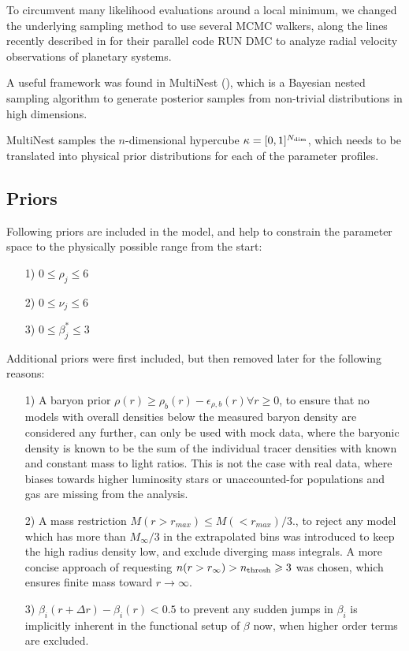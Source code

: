 To circumvent many likelihood evaluations around a local minimum, we
changed the underlying sampling method to use several MCMC walkers,
along the lines recently described in \citep{Nelson+2013} for their
parallel code RUN DMC to analyze radial velocity observations of
planetary systems.

A useful framework was found in MultiNest (\cite{Feroz+2009}), which
is a Bayesian nested sampling algorithm to generate posterior samples
from non-trivial distributions in high dimensions.

MultiNest samples the $n$-dimensional hypercube $\kappa=[0,1]^{N_{\rm  dim}}$, which needs to be translated into physical prior
distributions for each of the parameter profiles.

\subsection{Priors}
Following priors are included in the model, and help to constrain the parameter space to the physically possible range from the start:

\begin{enumerate}
    \item[1)] $0\leq \rho_j \leq 6$
    \item[2)] $0\leq \nu_j  \leq 6$
    \item[3)] $0\leq \beta^*_j\leq 3$
\end{enumerate}

Additional priors were first included, but then removed later for the
following reasons:

\begin{enumerate}
    \item[1)] A baryon prior $\rho(r) \geq
    \rho_b(r)-\epsilon_{\rho,b}(r) \forall r\geq0$, to ensure that no
    models with overall densities below the measured baryon density
    are considered any further, can only be used with mock data, where
    the baryonic density is known to be the sum of the individual
    tracer densities with known and constant mass to light
    ratios. This is not the case with real data, where biases towards
    higher luminosity stars or unaccounted-for populations and gas are
    missing from the analysis.

    \item[2)] A mass restriction $M(r>r_{max}) \leq M(<r_{max})/3.$,
    to reject any model which has more than $M_\infty/3$ in the
    extrapolated bins was introduced to keep the high radius density
    low, and exclude diverging mass integrals. A more concise approach
    of requesting $n(r>r_\infty)>n_{\rm thresh} \geq 3$ was chosen,
    which ensures finite mass toward $r\to\infty$.

    \item[3)] $\beta_i(r+\Delta r)-\beta_i(r) < 0.5$ to prevent any
    sudden jumps in $\beta_i$ is implicitly inherent in the functional
    setup of $\beta$ now, when higher order terms are excluded.
\end{enumerate}
